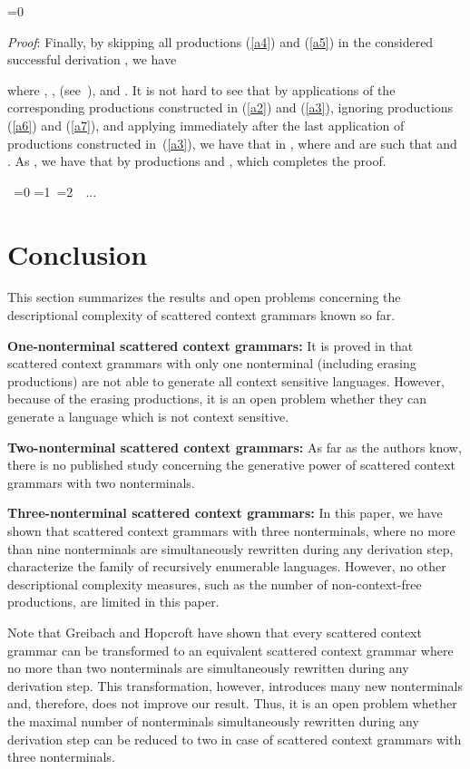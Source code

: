 \documentclass[copyright]{eptcs}
\makeatletter
\newcounter{d@proof}\let\thed@proof\relax\setcounter{d@proof}{0}
\newcommand*{\qed}{}
\newenvironment{proof}{\ifnum \value{d@proof}=0{\setcounter{claim}{0}}\else\fi
  \stepcounter{d@proof}\par\noindent
  {\rmfamily\itshape\mdseries Proof\/}:\hspace{\labelsep}\ignorespaces}{\addtocounter{d@proof}{-1}\mbox{}\nolinebreak\hfill~\ifnum \value{d@proof}=0{\qed}\else
    \ifnum \value{d@proof}=1{\qed\nolinebreak\,\nolinebreak\qed}\else
      \ifnum \value{d@proof}=2{\qed\nolinebreak\,\nolinebreak\qed
          \nolinebreak\,\nolinebreak\qed}\else
        {\qed\nolinebreak...\nolinebreak\qed}\fi\fi\fi
  \medbreak
}
\makeatother
\begin{document}
\begin{proof}
    Finally, by skipping all productions (\ref{a4}) and (\ref{a5}) in the considered successful derivation , we have
    
    where , ,  (see~), and . It is not hard to see that by applications of the corresponding productions constructed in (\ref{a2}) and (\ref{a3}), ignoring productions (\ref{a6}) and (\ref{a7}), and applying  immediately after the last application of productions constructed in~(\ref{a3}), we have that  in , where  and  are such that  and . As , we have that  by productions  and , which completes the proof.
  \end{proof}

\section{Conclusion}
  This section summarizes the results and open problems concerning the descriptional complexity of scattered context grammars known so far.

  {\bf One-nonterminal scattered context grammars:}
  It is proved in \cite{meduna2} that scattered context grammars with only one nonterminal (including erasing productions) are not able to generate all context sensitive languages. However, because of the erasing productions, it is an open problem whether they can generate a language which is not context sensitive.

  {\bf Two-nonterminal scattered context grammars:}
  As far as the authors know, there is no published study concerning the generative power of scattered context grammars with two nonterminals.

  {\bf Three-nonterminal scattered context grammars:}
  In this paper, we have shown that scattered context grammars with three nonterminals, where no more than nine nonterminals are simultaneously rewritten during any derivation step, characterize the family of recursively enumerable languages. However, no other descriptional complexity measures, such as the number of non-context-free productions, are limited in this paper.

  Note that Greibach and Hopcroft \cite{GreHop} have shown that every scattered context grammar can be transformed to an equivalent scattered context grammar where no more than two nonterminals are simultaneously rewritten during any derivation step. This transformation, however, introduces many new nonterminals and, therefore, does not improve our result. Thus, it is an open problem whether the maximal number of nonterminals simultaneously rewritten during any derivation step can be reduced to two in case of scattered context grammars with three nonterminals.
\end{document}
